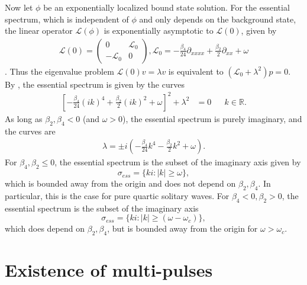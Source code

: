 \documentclass[12pt]{article}
\def\R{{\mathbb R}}
\def\calL{{\mathcal L}}
\begin{document}
Now let $\phi$ be an exponentially localized bound state solution. For the essential spectrum, which is independent of $\phi$ and only depends on the background state, the linear operator $\calL(\phi)$ is exponentially asymptotic to $\calL(0)$, given by
\begin{align}\label{defL0}
\calL(0) = 
\begin{pmatrix}
0 & \calL_0 \\
-\calL_0 & 0
\end{pmatrix},
\calL_0 = -\frac{\beta_4}{24} \partial_{xxxx} + \frac{\beta_2}{2} \partial_{xx} + \omega
\end{align}.
Thus the eigenvalue problem $\calL(0) v = \lambda v$ is equivalent to $(\calL_0 + \lambda^2)p = 0$. By \cite[Theorem 3.1.13]{Kapitula2013}, the essential spectrum is given by the curves
\begin{align*}
\left[ -\frac{\beta_4}{24} (ik)^4 + \frac{\beta_2}{2}(ik)^2 + \omega \right]^2 + \lambda^2 &= 0 && k \in \R.
\end{align*}
As long as $\beta_2, \beta_4 < 0$ (and $\omega > 0$), the essential spectrum is purely imaginary, and the curves are
\begin{align*}
\lambda = \pm i \left( -\frac{\beta_4}{24}k^4 - \frac{\beta_2}{2}k^2 + \omega \right).
\end{align*}
For $\beta_4, \beta_2 \leq 0$, the essential spectrum is the subset of the imaginary axis given by
\begin{equation}\label{PQSessspec}
\sigma_{ess} = \{ k i : |k| \geq \omega \},
\end{equation}
which is bounded away from the origin and does not depend on $\beta_2,\beta_4$. In particular, this is the case for pure quartic solitary waves. For $\beta_4 < 0, \beta_2 > 0$, the essential spectrum is the subset of the imaginary axis 
\begin{equation}
\sigma_{ess} = \{ k i : |k| \geq (\omega - \omega_c) \},
\end{equation}
which does depend on $\beta_2,\beta_4$, but is bounded away from the origin for $\omega > \omega_c$.

\section{Existence of multi-pulses}
\end{document}
